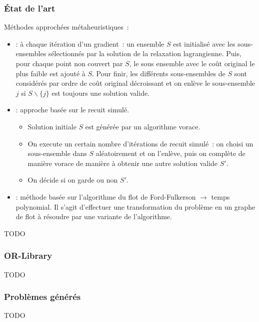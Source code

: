 \documentclass[aspectratio=169,11pt]{beamer}
\begin{document}
	\begin{frame}
		\frametitle{État de l'art}
		Méthodes approchées métaheuristiques~:
		\begin{itemize}
			\item \citeauthor{Beasley1990}: à chaque itération d'un gradient~: un ensemble \(S\) est initialisé avec les sous-ensembles sélectionnés par la solution de la relaxation lagrangienne. Puis, pour chaque point non couvert par \(S\), le sous ensemble avec le coût original le plus faible est ajouté à \(S\). Pour finir, les différents sous-ensembles de \(S\) sont considérés par ordre de coût original décroissant et on enlève le sous-ensemble \(j\) si \(S \backslash \{j\}\) est toujours une solution valide.~\cite{Beasley1990}	
			\item \citeauthor{jacobs1995lsh}: approche basée sur le recuit simulé.~\cite{jacobs1995lsh}
				\begin{itemize}
					\item Solution initiale \(S\) est générée par un algorithme vorace.
					\item On execute un certain nombre d'itérations de recuit simulé~:
					on choisi un sous-ensemble dans \(S\) aléatoirement
					et on l'enlève, puis on complète de manière vorace de manière à obtenir une autre solution valide \(S'\).
					\item On décide si on garde ou non \(S'\).
				\end{itemize}
			\item \citeauthor{Afif1995}: méthode basée sur l'algorithme du flot de Ford-Fulkerson \(\rightarrow\) temps polynomial. Il s'agit d'effectuer une transformation du problème en un graphe de flot à résoudre par une variante de l'algorithme.~\cite{Afif1995}
		\end{itemize}
	\end{frame}


	\begin{frame}
		\centering TODO
	\end{frame}


	\begin{frame}
		\frametitle{OR-Library}
		\centering TODO
	\end{frame}

	\begin{frame}
		\frametitle{Problèmes générés}
		\centering TODO
	\end{frame}
\end{document}
